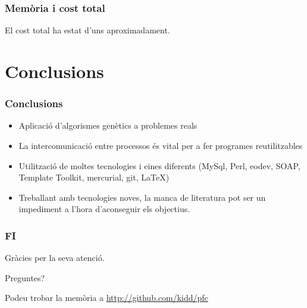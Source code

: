 \documentclass{beamer}
\begin{document}
\begin{frame}
	\frametitle{Memòria i cost total}
		\begin{center}
			
		\end{center}

		El cost total ha estat d'uns  aproximadament.

\end{frame}


\section{Conclusions} %
\label{sec:Conclusions}

\begin{frame}
\frametitle{Conclusions}
	\begin{itemize}
		\item Aplicació d'algorismes genètics a problemes reals
		\item La intercomunicació entre processos és vital per a fer programes reutilitzables
		\item Utilització de moltes tecnologies i eines diferents (MySql, Perl, eodev, SOAP, Template
			Toolkit, mercurial, git, LaTeX)
		\item Treballant amb tecnologies noves, la manca de literatura pot ser un impediment a
			l'hora d'aconseguir els objectius.
	\end{itemize}
\end{frame}

\begin{frame}
	\frametitle{FI}
	Gràcies per la seva atenció.

	Preguntes?

	\begin{center}
	\end{center}

	Podeu trobar la memòria a \url{http://github.com/kidd/pfc}

\end{frame}

\end{document}
